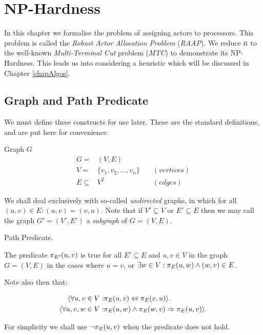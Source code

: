 \chapter{NP-Hardness}
\label{chapHardness}

In this chapter we formalise the problem of assigning actors to processors.
This problem is called the {\em Robust Actor Allocation Problem} ({\em RAAP}).
We reduce it to the well-known {\em Multi-Terminal Cut} problem ({\em MTC}) to demonstrate its NP-Hardness.
This leads us into considering a heuristic which will be discussed in Chapter \ref{chapAlgos}.

\section{Graph and Path Predicate}

We must define these constructs for use later.
These are the standard definitions, and are put here for convenience.

\begin{definition}
Graph $G$
\begin{align}
	\nonumber G = & (V,E) \\
	\nonumber V = & \{v_1, v_2, ..., v_n\} \quad & (vertices)\\
	\nonumber E \subseteq & V^2 & (edges)
\end{align}

\noindent We shall deal exclusively with so-called {\em undirected} graphs, in which for all $(u,v) \in E : (u,v) = (v,u)$.
Note that if $V' \subseteq V$ or $E' \subseteq E$ then we may call the graph $G'=(V',E')$ a \emph{subgraph} of $G=(V,E)$.

\end{definition}

\begin{definition}
\label{defHardPath}
Path Predicate.

The predicate $\pi_{E'}(u, v)$ is true for all $E' \subseteq E$ and $u, v \in V$ in the graph $G=(V,E)$ in the cases where $u = v$, or  $\exists w \in V : \pi_{E}(u, w) \wedge (w, v) \in E$.

Note also then that:

\begin{align}
	\nonumber \langle \forall u, v \in V: & \pi_{E}(u, v) \Leftrightarrow \pi_{E}(v, u) \rangle. \\
	\nonumber \langle \forall u, v, w \in V: & \pi_{E}(u, w) \wedge \pi_{E}(w, v) \Rightarrow \pi_{E}(u, v) \rangle.
\end{align}

For simplicity we shall use $\neg\pi_{E}(u, v)$ when the predicate does not hold.

\end{definition}

